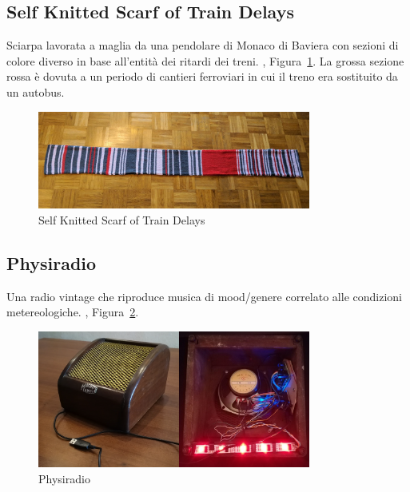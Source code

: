 \documentclass[12pt,a4paper]{report}
\begin{document}
\subsection{Self Knitted Scarf of Train Delays}
Sciarpa lavorata a maglia da una pendolare di Monaco di Baviera con sezioni di colore diverso in base all'entità dei ritardi dei treni.
\cite{physlist}, Figura~\ref{fig:scarfdelays}.
La grossa sezione rossa è dovuta a un periodo di cantieri ferroviari in cui il treno era sostituito da un autobus.

\begin{figure}[h]
  \centering
  \includegraphics[width=0.8\textwidth]{scarfdelays}
  \caption{Self Knitted Scarf of Train Delays}
  \label{fig:scarfdelays}
\end{figure}

\subsection{Physiradio}
Una radio vintage che riproduce musica di mood/genere correlato alle condizioni metereologiche. \cite{physiradio}, Figura~\ref{fig:physiradio}.
\begin{figure}[h]
  \centering
  \includegraphics[width=0.8\textwidth]{physiradio}
  \caption{Physiradio}
  \label{fig:physiradio}
\end{figure}
\end{document}
